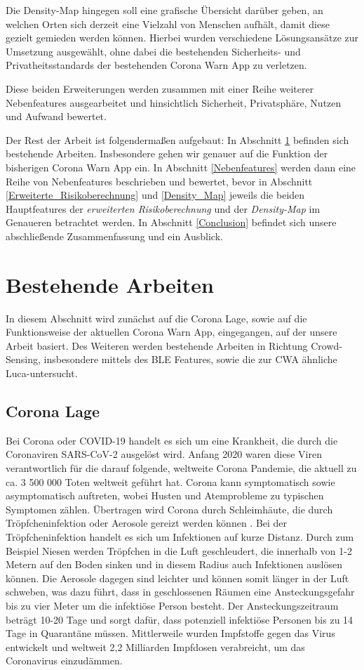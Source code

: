 \documentclass[conference,compsoc]{IEEEtran}
\begin{document}
Die Density-Map hingegen soll eine grafische Übersicht darüber geben, an welchen Orten sich derzeit eine Vielzahl von Menschen aufhält, damit diese gezielt gemieden werden können. 
Hierbei wurden verschiedene Lösungsansätze zur Umsetzung ausgewählt, ohne dabei die bestehenden Sicherheits- und Privatheitsstandards der bestehenden Corona Warn App zu verletzen. 

Diese beiden Erweiterungen werden zusammen mit einer Reihe weiterer Nebenfeatures ausgearbeitet und hinsichtlich Sicherheit, Privatsphäre, Nutzen und Aufwand bewertet. 

Der Rest der Arbeit ist folgendermaßen aufgebaut: In Abschnitt \ref{rel_work} befinden sich bestehende Arbeiten. 
Insbesondere gehen wir genauer auf die Funktion der bisherigen Corona Warn App ein. 
In Abschnitt \ref{Nebenfeatures} werden dann eine Reihe von Nebenfeatures beschrieben und bewertet,
bevor in Abschnitt \ref{Erweiterte_Risikoberechnung} und \ref{Density_Map} jeweils die beiden Hauptfeatures der \textit{erweiterten Risikoberechnung} und der \textit{Density-Map} im Genaueren betrachtet werden. 
In Abschnitt \ref{Conclusion} befindet sich unsere abschließende Zusammenfassung und ein Ausblick. 

\section{Bestehende Arbeiten} \label{rel_work}

In diesem Abschnitt wird zunächst auf die Corona Lage, sowie auf die Funktionsweise der aktuellen Corona Warn App, eingegangen, auf der unsere Arbeit basiert. 
Des Weiteren werden  bestehende Arbeiten in Richtung Crowd-Sensing, insbesondere mittels des BLE Features, sowie die zur CWA ähnliche Luca-untersucht. 
\subsection{Corona Lage}
Bei Corona oder COVID-19 handelt es sich um eine Krankheit, die durch die Coronaviren SARS-CoV-2 ausgelöst wird. 
Anfang 2020 waren diese Viren verantwortlich für die darauf folgende, weltweite Corona Pandemie, die aktuell zu ca. 3 500 000 Toten \cite{CoronaZahlenWorld} weltweit geführt hat. 
Corona kann symptomatisch sowie asymptomatisch auftreten, wobei Husten und Atemprobleme zu typischen Symptomen zählen.
Übertragen wird Corona durch Schleimhäute, die durch Tröpfcheninfektion oder Aerosole gereizt werden können \cite{Ubertragungswege}.
Bei der Tröpfcheninfektion handelt es sich um Infektionen auf kurze Distanz. Durch zum Beispiel Niesen werden Tröpfchen in die Luft geschleudert, die innerhalb von 1-2 Metern auf den Boden sinken und in diesem Radius auch Infektionen auslösen können. 
Die Aerosole dagegen sind leichter und können somit länger in der Luft schweben, 
was dazu führt, dass in geschlossenen Räumen eine Ansteckungsgefahr bis zu vier Meter um die infektiöse Person besteht. 
Der Ansteckungszeitraum beträgt 10-20 Tage und sorgt dafür, dass potenziell infektiöse Personen bis zu 14 Tage in Quarantäne müssen.
Mittlerweile wurden Impfstoffe gegen das Virus entwickelt und weltweit 2,2 Milliarden Impfdosen \cite{CoronaZahlenWorld} verabreicht, um das Coronavirus einzudämmen.
\end{document}
